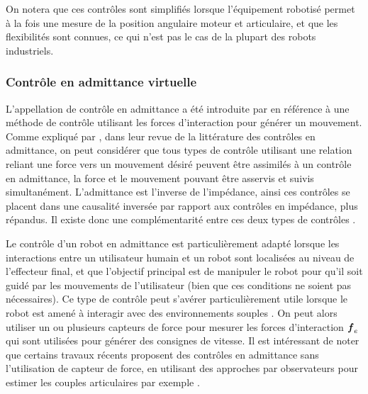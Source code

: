 On notera que ces contrôles sont simplifiés lorsque l'équipement robotisé permet à la fois une mesure de la position angulaire moteur et articulaire, et que les flexibilités sont connues, ce qui n'est pas le cas de la plupart des robots industriels.

\subsubsection{Contrôle en admittance virtuelle} \label{chap2_sec_cmd_collab_subsec_cmd_imp_2}

L'appellation de contrôle en admittance a été introduite par \textcite{newman_stability_1992} en référence à une méthode de contrôle utilisant les forces d'interaction pour générer un mouvement. Comme expliqué par \textcite{keemink_admittance_2018}, dans leur revue de la littérature des contrôles en admittance, on peut considérer que tous types de contrôle utilisant une relation reliant une force vers un mouvement désiré peuvent être assimilés à un contrôle en admittance, la force et le mouvement pouvant être asservis et suivis simultanément. L'admittance est l'inverse de l'impédance, ainsi ces contrôles se placent dans une causalité inversée par rapport aux contrôles en impédance, plus répandus. Il existe donc une complémentarité entre ces deux types de contrôles \parencite{ott_unified_2010, keemink_admittance_2018}.

Le contrôle d'un robot en admittance est particulièrement adapté lorsque les interactions entre un utilisateur humain et un robot sont localisées au niveau de l'effecteur final, et que l'objectif principal est de manipuler le robot pour qu'il soit guidé par les mouvements de l'utilisateur (bien que ces conditions ne soient pas nécessaires). Ce type de contrôle peut s'avérer particulièrement utile lorsque le robot est amené à interagir avec des environnements souples \parencite{ott_unified_2010}. On peut alors utiliser un ou plusieurs capteurs de force pour mesurer les forces d'interaction $\vect{f}_e$ qui sont utilisées pour générer des consignes de vitesse. Il est intéressant de noter que certains travaux récents proposent des contrôles en admittance sans l'utilisation de capteur de force, en utilisant des approches par observateurs pour estimer les couples articulaires par exemple \parencite{yang_force_2021}.

